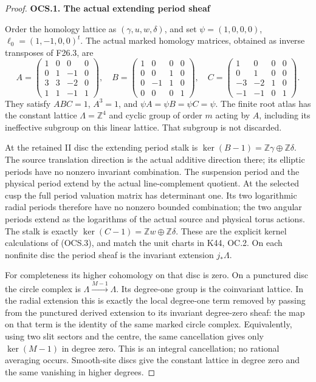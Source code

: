 \begin{proof}
\par

\medskip\noindent\textbf{OCS.1. The actual extending period sheaf}

\par\nobreak

Order the homology lattice as \((\gamma,u,w,\delta)\), and set
\(\psi=(1,0,0,0)\), \(\ell_0=(1,-1,0,0)^t\). The actual marked
homology matrices, obtained as inverse transposes of F26.3, are
\[
 A=\begin{pmatrix}1&0&0&0\\0&1&-1&0\\3&3&-2&0\\1&1&-1&1\end{pmatrix},
 \quad B=\begin{pmatrix}1&0&0&0\\0&0&1&0\\0&-1&1&0\\0&0&0&1\end{pmatrix},
 \quad C=\begin{pmatrix}1&0&0&0\\0&1&0&0\\-3&-2&1&0\\-1&-1&0&1\end{pmatrix}.
\tag{OCS.3}
\]
They satisfy \(ABC=1\), \(A^3=1\), and \(\psi A=\psi B=\psi C=\psi\).
The finite root atlas has the constant lattice \(\Lambda=\mathbb Z^4\)
and cyclic group of order \(m\) acting by \(A\), including its
ineffective subgroup on this linear lattice. That subgroup is not
discarded.

At the retained II disc the extending period stalk is
\(\ker(B-1)=\mathbb Z\gamma\oplus\mathbb Z\delta\). The source
translation direction is the actual additive direction there; its
elliptic periods have no nonzero invariant combination. The suspension
period and the physical period extend by the actual line-complement
quotient. At the selected cusp the full period valuation matrix has
determinant one. Its two logarithmic radial periods therefore have
no nonzero bounded combination; the two angular periods extend as
the logarithms of the actual source and physical torus actions.
The stalk is exactly
\(\ker(C-1)=\mathbb Zw\oplus\mathbb Z\delta\).
These are the explicit kernel calculations of (OCS.3), and match
the unit charts in K44, OC.2. On each nonfinite disc the period sheaf
is the invariant extension \(j_*\Lambda\).

For completeness its higher cohomology on that disc is zero. On a
punctured disc the circle complex is
\(\Lambda\xrightarrow{M-1}\Lambda\). Its degree-one group is
the coinvariant lattice. In the radial extension this is exactly the
local degree-one term removed by passing from the punctured derived
extension to its invariant degree-zero sheaf: the map on that term
is the identity of the same marked circle complex. Equivalently,
using two slit sectors and the centre, the same cancellation gives
only \(\ker(M-1)\) in degree zero. This is an integral cancellation;
no rational averaging occurs. Smooth-site discs give the constant
lattice in degree zero and the same vanishing in higher degrees.


\end{proof}
